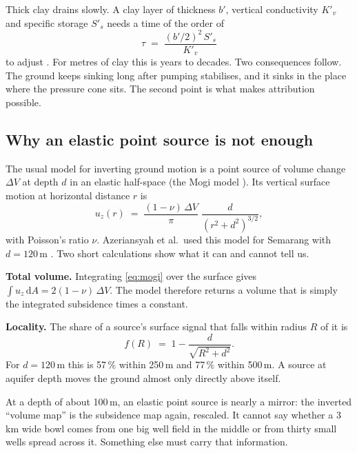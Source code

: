 Thick clay drains slowly. A clay layer of thickness $b'$, vertical conductivity $K'_v$ and specific
storage $S'_s$ needs a time of the order of
\begin{equation}
\tau \;=\; \frac{(b'/2)^2\,S'_s}{K'_v}
\end{equation}
to adjust \cite{galloway2011}. For metres of clay this is years to decades. Two consequences follow.
The ground keeps sinking long after pumping stabilises, and it sinks in the place where the pressure
cone sits. The second point is what makes attribution possible.

\subsection{Why an elastic point source is not enough}\label{sec:identity}

The usual model for inverting ground motion is a point source of volume change $\Delta V$ at depth
$d$ in an elastic half-space (the Mogi model \cite{mogi1958,geertsma1973}). Its vertical surface
motion at horizontal distance $r$ is
\begin{equation}
u_z(r) \;=\; \frac{(1-\nu)\,\Delta V}{\pi}\;\frac{d}{(r^2+d^2)^{3/2}},
\label{eq:mogi}
\end{equation}
with Poisson's ratio $\nu$. Azeriansyah et al.\ used this model for Semarang with $d = 120$\,m
\cite{azeriansyah2025}. Two short calculations show what it can and cannot tell us.

\textbf{Total volume.} Integrating \eqref{eq:mogi} over the surface gives
$\int u_z\,\mathrm{d}A = 2(1-\nu)\,\Delta V$. The model therefore returns a volume that is simply the
integrated subsidence times a constant.

\textbf{Locality.} The share of a source's surface signal that falls within radius $R$ of it is
\begin{equation}
f(R) \;=\; 1-\frac{d}{\sqrt{R^2+d^2}} .
\end{equation}
For $d = 120$\,m this is 57\,\% within 250\,m and 77\,\% within 500\,m. A source at aquifer depth
moves the ground almost only directly above itself.

\begin{plain}
At a depth of about 100\,m, an elastic point source is nearly a mirror: the inverted ``volume map''
is the subsidence map again, rescaled. It cannot say whether a 3\,km wide bowl comes from one big
well field in the middle or from thirty small wells spread across it. Something else must carry that
information.
\end{plain}

